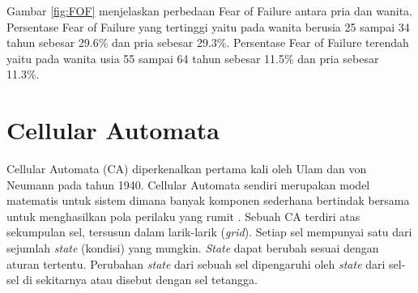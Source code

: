 Gambar \ref{fig:FOF} menjelaskan perbedaan Fear of Failure antara pria dan wanita. Persentase Fear of Failure yang tertinggi yaitu pada wanita berusia 25 sampai 34 tahun sebesar 29.6\% dan pria sebesar 29.3\%. Persentase Fear of Failure terendah yaitu pada wanita usia 55 sampai 64 tahun sebesar 11.5\% dan pria sebesar 11.3\%. 

\section{Cellular Automata}
\label{sec:cellularautomata}

Cellular Automata (CA) diperkenalkan pertama kali oleh Ulam dan von Neumann pada tahun 1940. Cellular Automata sendiri merupakan model matematis untuk sistem dimana banyak komponen sederhana bertindak bersama untuk menghasilkan pola perilaku yang rumit \cite{referensiCA2}. Sebuah CA terdiri atas sekumpulan sel, tersusun dalam larik-larik (\textit{grid}). Setiap sel mempunyai satu dari sejumlah \textit{state} (kondisi) yang mungkin. \textit{State} dapat berubah sesuai dengan aturan tertentu. Perubahan \textit{state} dari sebuah sel dipengaruhi oleh \textit{state} dari sel-sel di sekitarnya atau disebut dengan sel tetangga.

